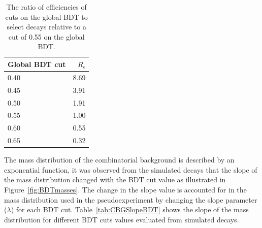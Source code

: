 \begin{table}[htbp]
\begin{center}
\begin{tabular}{lr}
\toprule \toprule
Global BDT cut & $R_{\epsilon}$ \\ \midrule 
0.40 & 8.69 \\
0.45 & 3.91 \\
0.50 & 1.91 \\
0.55 & 1.00 \\
0.60 & 0.55 \\
0.65 & 0.32 \\ \bottomrule \bottomrule
\end{tabular}
\vspace{0.7cm}

\caption{The ratio of efficiencies of cuts on the global BDT to select \bbbarmumux decays relative to a cut of 0.55 on the global BDT. }
\label{tab:EfficiencyRatioCombBG}
\end{center}
\vspace{-1.0cm}
\end{table}


The mass distribution of the combinatorial background is described by an exponential function, it was observed from the simulated \bbbarmumux decays that the slope of the mass distribution changed with the BDT cut value as illustrated in Figure~\ref{fig:BDTmasses}. The change in the slope value is accounted for in the mass distribution used in the pseudoexperiment by changing the slope parameter ($\lambda$) for each BDT cut. Table~\ref{tab:CBGSlopeBDT} shows the slope of the mass distribution for different BDT cuts values evaluated from \bbbarmumux simulated decays.

